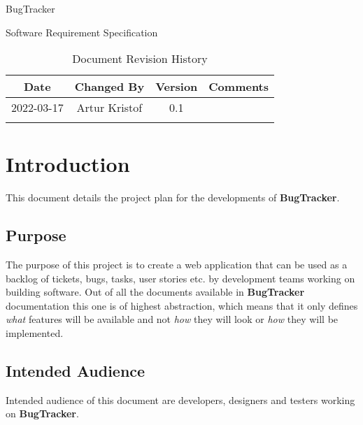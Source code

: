 \documentclass[a4paper]{article}
\newcommand{\appName}{BugTracker}
\newcommand{\appNameBold}{\textbf{BugTracker}}
\begin{document}
    \begin{titlepage}
        \vspace*{\fill}
        \begin{center}
            \huge
            \appName{}

            \vspace{0.4cm}
            \Huge
            Software Requirement Specification

            \vspace{3cm}
            \begin{table}[h]
                \centering
                \caption{Document Revision History}
                \begin{tabular}{cccc}
                    \hline
                    Date & Changed By & Version & Comments \\
                    \hline
                    2022-03-17 & Artur Kristof & 0.1 & \hfill \\
                    \hfill & \hfill & \hfill & \hfill \\
                    \hline
                \end{tabular}
            \end{table}
        \end{center}
        \vspace*{\fill}
    \end{titlepage}

    \tableofcontents

    \section{Introduction}
    This document details the project plan for the developments of \appNameBold{}.

    \subsection{Purpose}
    The purpose of this project is to create a web application that can be used as a backlog of tickets, bugs, tasks, user stories etc. by development teams working on building software.
    Out of all the documents available in \appNameBold{} documentation this one is of highest abstraction, which means that it only defines \textit{what} features will be available
    and not \textit{how} they will look or \textit{how} they will be implemented.

    \subsection{Intended Audience}
    Intended audience of this document are developers, designers and testers working on \appNameBold{}.
\end{document}
